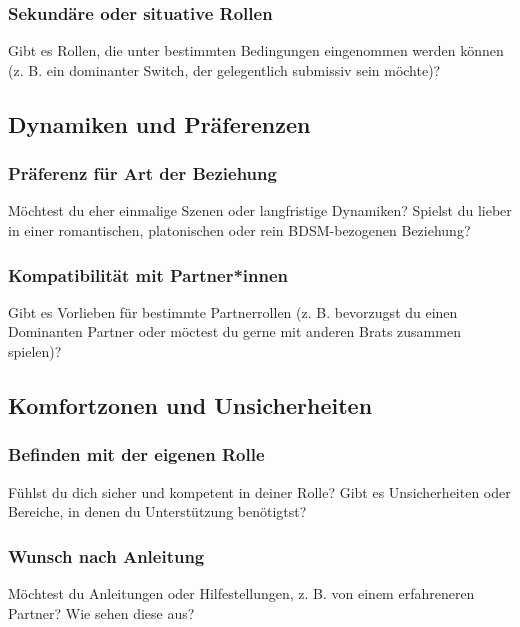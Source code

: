 \documentclass[a4paper,12pt]{article}
\begin{document}
\subsubsection{Sekundäre oder situative Rollen}
\noindent Gibt es Rollen, die unter bestimmten Bedingungen eingenommen werden können (z. B. ein dominanter Switch, der gelegentlich submissiv sein möchte)?\newline
\noindent \TextField[name=ErfahrungAndereRolle,multiline=true,height=7em, width=37em]{}

\subsection{Dynamiken und Präferenzen}
\subsubsection{Präferenz für Art der Beziehung}
\noindent Möchtest du eher einmalige Szenen oder langfristige Dynamiken? Spielst du lieber in einer romantischen, platonischen oder rein BDSM-bezogenen Beziehung?\newline
\noindent \TextField[name=PraefDynamik,multiline=true,height=7em, width=37em]{}

\subsubsection{Kompatibilität mit Partner*innen}
\noindent Gibt es Vorlieben für bestimmte Partnerrollen (z. B. bevorzugst du einen Dominanten Partner oder möctest du gerne mit anderen Brats zusammen spielen)?\newline
\noindent \TextField[name=PraefKomp,multiline=true,height=7em, width=37em]{}

\subsection{Komfortzonen und Unsicherheiten}
\subsubsection{Befinden mit der eigenen Rolle}
\noindent Fühlst du dich sicher und kompetent in deiner Rolle? Gibt es Unsicherheiten oder Bereiche, in denen du Unterstützung benötigtst?\newline
\noindent \TextField[name=ComfUnRolle,multiline=true,height=7em, width=37em]{}

\subsubsection{Wunsch nach Anleitung}
\noindent Möchtest du Anleitungen oder Hilfestellungen, z. B. von einem erfahreneren Partner? Wie sehen diese aus? \newline
\noindent \TextField[name=ComfUnHilfe,multiline=true,height=7em, width=37em]{}
\end{document}
